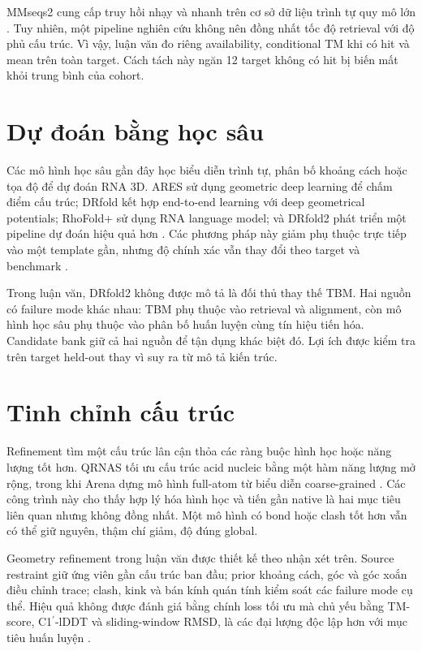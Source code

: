 \documentclass[12pt,a4paper,oneside]{report}
\newcommand{\cprime}{C1$^{\prime}$}
\begin{document}
MMseqs2 cung cấp truy hồi nhạy và nhanh trên cơ sở dữ liệu trình tự quy mô lớn
\cite{mmseqs2}. Tuy nhiên, một pipeline nghiên cứu không nên đồng nhất tốc độ retrieval
với độ phủ cấu trúc. Vì vậy, luận văn đo riêng availability, conditional TM khi có hit
và mean trên toàn target. Cách tách này ngăn 12 target không có hit bị biến mất khỏi
trung bình của cohort.

\section{Dự đoán bằng học sâu}

Các mô hình học sâu gần đây học biểu diễn trình tự, phân bố khoảng cách hoặc tọa độ để
dự đoán RNA 3D. ARES sử dụng geometric deep learning để chấm điểm cấu trúc; DRfold kết
hợp end-to-end learning với deep geometrical potentials; RhoFold+ sử dụng RNA language
model; và DRfold2 phát triển một pipeline dự đoán hiệu quả hơn
\cite{ares,drfold,rhofoldplus,drfold2}. Các phương pháp này giảm phụ thuộc trực tiếp vào
một template gần, nhưng độ chính xác vẫn thay đổi theo target và benchmark
\cite{state_of_rnart,drfold2}.

Trong luận văn, DRfold2 không được mô tả là đối thủ thay thế TBM. Hai nguồn có failure
mode khác nhau: TBM phụ thuộc vào retrieval và alignment, còn mô hình học sâu phụ thuộc
vào phân bố huấn luyện cùng tín hiệu tiến hóa. Candidate bank giữ cả hai nguồn để tận
dụng khác biệt đó. Lợi ích được kiểm tra trên target held-out thay vì suy ra từ mô tả
kiến trúc.

\section{Tinh chỉnh cấu trúc}

Refinement tìm một cấu trúc lân cận thỏa các ràng buộc hình học hoặc năng lượng tốt hơn.
QRNAS tối ưu cấu trúc acid nucleic bằng một hàm năng lượng mở rộng, trong khi Arena dựng
mô hình full-atom từ biểu diễn coarse-grained \cite{qrnas,arena}. Các công trình này
cho thấy hợp lý hóa hình học và tiến gần native là hai mục tiêu liên quan nhưng không
đồng nhất. Một mô hình có bond hoặc clash tốt hơn vẫn có thể giữ nguyên, thậm chí giảm,
độ đúng global.

Geometry refinement trong luận văn được thiết kế theo nhận xét trên. Source restraint
giữ ứng viên gần cấu trúc ban đầu; prior khoảng cách, góc và góc xoắn điều chỉnh trace;
clash, kink và bán kính quán tính kiểm soát các failure mode cụ thể. Hiệu quả không được
đánh giá bằng chính loss tối ưu mà chủ yếu bằng TM-score, \cprime{}-lDDT và
sliding-window RMSD, là các đại lượng độc lập hơn với mục tiêu huấn luyện
\cite{tm_score,lddt,usalign}.
\end{document}
